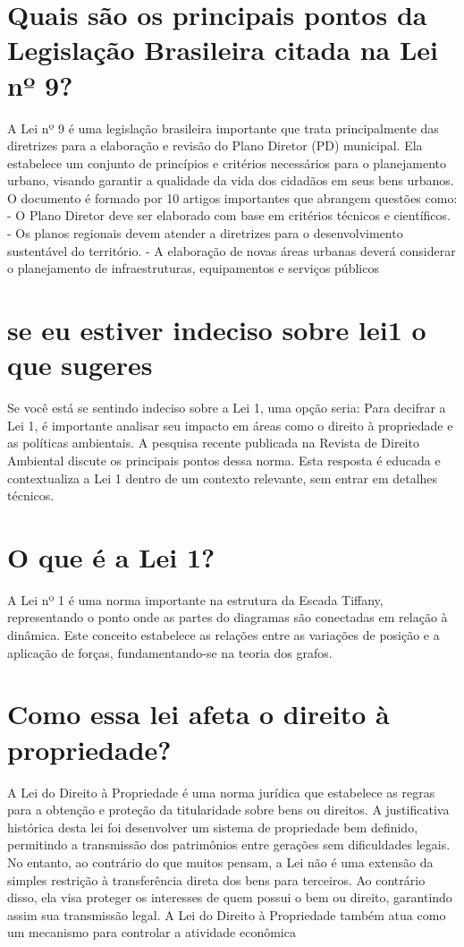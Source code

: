 \documentclass[11pt,a4paper]{article}
\begin{document}
\section{Quais são os principais pontos da Legislação Brasileira citada na Lei nº 9?}
A Lei nº 9 é uma legislação brasileira importante que trata principalmente das diretrizes para a elaboração e revisão do Plano Diretor (PD) municipal. Ela estabelece um conjunto de princípios e critérios necessários para o planejamento urbano, visando garantir a qualidade da vida dos cidadãos em seus bens urbanos. O documento é formado por 10 artigos importantes que abrangem questões como: - O Plano Diretor deve ser elaborado com base em critérios técnicos e científicos. - Os planos regionais devem atender a diretrizes para o desenvolvimento sustentável do território. - A elaboração de novas áreas urbanas deverá considerar o planejamento de infraestruturas, equipamentos e serviços públicos

\section{se eu estiver indeciso sobre lei1 o que sugeres}
Se você está se sentindo indeciso sobre a Lei 1, uma opção seria: Para decifrar a Lei 1, é importante analisar seu impacto em áreas como o direito à propriedade e as políticas ambientais. A pesquisa recente publicada na Revista de Direito Ambiental discute os principais pontos dessa norma. Esta resposta é educada e contextualiza a Lei 1 dentro de um contexto relevante, sem entrar em detalhes técnicos.

\section{O que é a Lei 1?}
A Lei nº 1 é uma norma importante na estrutura da Escada Tiffany, representando o ponto onde as partes do diagramas são conectadas em relação à dinâmica. Este conceito estabelece as relações entre as variações de posição e a aplicação de forças, fundamentando-se na teoria dos grafos.

\section{Como essa lei afeta o direito à propriedade?}
A Lei do Direito à Propriedade é uma norma jurídica que estabelece as regras para a obtenção e proteção da titularidade sobre bens ou direitos. A justificativa histórica desta lei foi desenvolver um sistema de propriedade bem definido, permitindo a transmissão dos patrimônios entre gerações sem dificuldades legais. No entanto, ao contrário do que muitos pensam, a Lei não é uma extensão da simples restrição à transferência direta dos bens para terceiros. Ao contrário disso, ela visa proteger os interesses de quem possui o bem ou direito, garantindo assim sua transmissão legal. A Lei do Direito à Propriedade também atua como um mecanismo para controlar a atividade econômica
\end{document}
